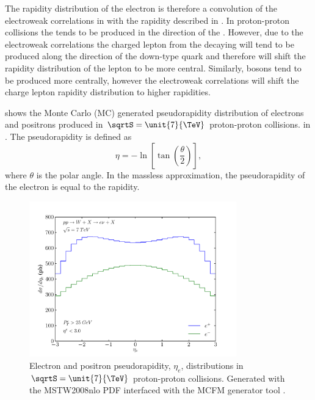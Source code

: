 The rapidity distribution of the electron is therefore a convolution of the
{electroweak} correlations in  with the \PW rapidity
described in .  In proton-proton collisions the \PWp
tends to be produced in the direction of the \Pup.  However, due to the
electroweak correlations the charged lepton from the decaying \PWp will tend to
be produced along the direction of the down-type quark and therefore will shift
the rapidity distribution of the lepton to be more central. Similarly, \PWm
bosons tend to be produced more centrally, however the electroweak correlations
will shift the charge lepton rapidity distribution to higher rapidities.

 shows the Monte Carlo (MC) generated
pseudorapidity distribution of electrons and positrons produced in
$\sqrtS=\unit{7}{\TeV}$ proton-proton collisions.  
in .  The pseudorapidity is defined as 
\begin{equation}
    \eta = -\ln\left[\tan\left(\frac{\theta}{2}\right)\right], 
\end{equation}
where $\theta$ is the polar angle.  In the massless approximation, the
pseudorapidity of the electron is equal to the rapidity.

\begin{figure}[htbp]
  \centering
  \includegraphics[width=0.8\textwidth]{lepton-rapidity}
  \caption[Electron and positron pseudorapidity, $\eta_e$, distributions in
$\sqrtS=\unit{7}{\TeV}$ proton-proton collisions.] {Electron and positron
pseudorapidity, $\eta_e$, distributions in $\sqrtS=\unit{7}{\TeV}$ proton-proton
collisions.  Generated with the MSTW2008nlo PDF\cite{martin2009parton}
interfaced with the MCFM generator tool \cite{campbellmcfm}.}
  \label{fig:leptonrapidity}
\end{figure}

